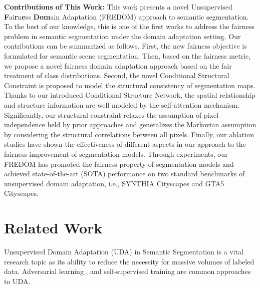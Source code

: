 \documentclass[10pt,twocolumn,letterpaper]{article}
\begin{document}
\noindent
\textbf{Contributions of This Work:} This work presents a novel Unsupervised \textbf{F}ai\textbf{r}n\textbf{e}ss \textbf{Dom}ain Adaptation (FREDOM) approach to semantic segmentation. To the best of our knowledge, this is one of the first works to address the fairness problem in semantic segmentation under the domain adaptation setting. Our contributions can be summarized as follows. First, the new fairness objective is formulated for semantic scene segmentation. Then, based on the fairness metric, we propose a novel fairness domain adaptation approach based on the fair treatment of class distributions. Second, the novel Conditional Structural Constraint is proposed to model the structural consistency of segmentation maps. 
Thanks to our introduced Conditional Structure Network, the spatial relationship and structure information are well modeled by the self-attention mechanism. Significantly, our structural constraint relaxes the assumption of pixel independence held by prior approaches and generalizes the Markovian assumption by considering the structural correlations between all pixels. Finally, our ablation studies have shown the effectiveness of different aspects in our approach to the fairness improvement of segmentation models. Through experiments, our FREDOM has promoted the fairness property of segmentation models and achieved state-of-the-art (SOTA) performance on two standard benchmarks of unsupervised domain adaptation, i.e., SYNTHIA  Cityscapes and GTA5  Cityscapes. 

\vspace{-1mm}
\section{Related Work}
\vspace{-1mm}


Unsupervised Domain Adaptation (UDA) in Semantic Segmentation is a vital research topic as its ability to reduce the necessity for massive volumes of labeled data. 
Adversarial learning \cite{chen2018road, hong2018CVPR, tsai2018learning, ganin2015unsupervised, long2015learning, tzeng2017adversarial}, and self-supervised training \cite{Araslanov:2021:DASAC, zhang2021prototypical, daformer, procst} are common approaches to UDA.
\end{document}
